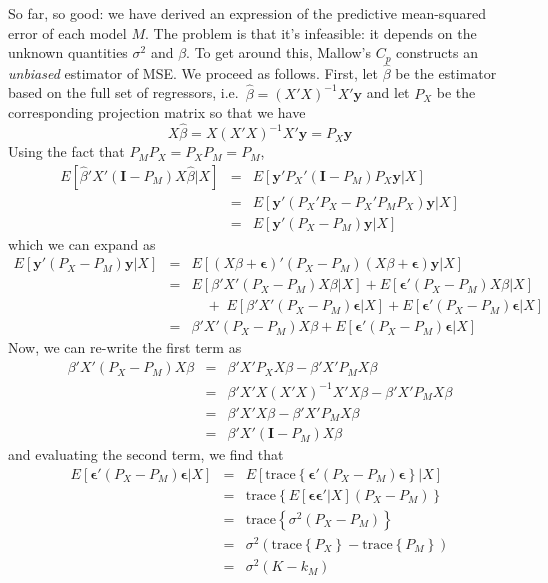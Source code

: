 So far, so good: we have derived an expression of the predictive mean-squared error of each model $M$. The problem is that it's infeasible: it depends on the unknown quantities $\sigma^2$ and $\beta$. To get around this, Mallow's $C_p$ constructs an \emph{unbiased} estimator of MSE. We proceed as follows. First, let $\widehat{\beta}$ be the estimator based on the full set of regressors, i.e.\ $\widehat{\beta} = (X'X)^{-1}X'\mathbf{y}$ and let $P_{X}$ be the corresponding projection matrix so that we have 
		$$X \widehat{\beta} = X(X'X)^{-1}X'\mathbf{y} = P_{X}\mathbf{y}$$
Using the fact that $P_MP_X = P_XP_M = P_M$, 
	\begin{eqnarray*}
		E\left[\widehat{\beta}'X'(\mathbf{I} - P_M)X\widehat{\beta} |X\right] &=& E\left[\mathbf{y}'P_X'(\mathbf{I} - P_M)P_{X}\mathbf{y} |X\right]\\
			&=& E\left[\mathbf{y}'(P_X'P_X - P_X'P_MP_X)\mathbf{y} |X\right]\\
			&=& E\left[\mathbf{y}'(P_X - P_M)\mathbf{y} |X\right]
	\end{eqnarray*}
which we can expand as
      \begin{eqnarray*}
     E\left[\mathbf{y}'(P_X - P_M)\mathbf{y} |X\right]&=& E\left[(X\beta + \boldsymbol{\epsilon})'(P_X - P_M)(X\beta + \boldsymbol{\epsilon})\mathbf{y} |X\right]\\
  		&=& E\left[\beta'X'(P_X - P_M)X\beta|X\right] + E[\boldsymbol{\epsilon}'(P_X - P_M)X\beta|X] \\
				&& \quad  + \; E[\beta'X'(P_X - P_M)\boldsymbol{\epsilon}|X] + E[\boldsymbol{\epsilon}'(P_X - P_M)\boldsymbol{\epsilon}|X]\\
			&=& \beta'X'(P_X - P_M)X\beta +  E[\boldsymbol{\epsilon}'(P_X - P_M)\boldsymbol{\epsilon}|X]
    \end{eqnarray*}
Now, we can re-write the first term as    
    \begin{eqnarray*}
    \beta'X'(P_X - P_M)X\beta  &=& \beta'X'P_X X\beta - \beta'X'P_MX\beta\\
      &=& \beta'X'X(X'X)^{-1}X' X\beta - \beta'X'P_MX\beta\\
      &=& \beta'X'X\beta - \beta'X'P_MX\beta\\
      &=& \beta'X'(\textbf{I} - P_M)X\beta
    \end{eqnarray*}
and evaluating the second term, we find that
    \begin{eqnarray*}
			E[\boldsymbol{\epsilon}'(P_X - P_M)\boldsymbol{\epsilon}|X]&=&E[\mbox{trace}\left\{\boldsymbol{\epsilon}'(P_X - P_M)\boldsymbol{\epsilon}\right\}|X]\\
      &=&  \mbox{trace}\left\{E[\boldsymbol{\boldsymbol{\epsilon}\epsilon}'|X](P_X - P_M)\right\}\\
			&=&\mbox{trace}\left\{\sigma^2(P_X - P_M)\right\}\\ 
			&=& \sigma^2 \left(\mbox{trace}\left\{P_X\right\} - \mbox{trace}\left\{P_M\right\}\right)\\ 
			&=& \sigma^2 (K - k_M) 
      \end{eqnarray*}
